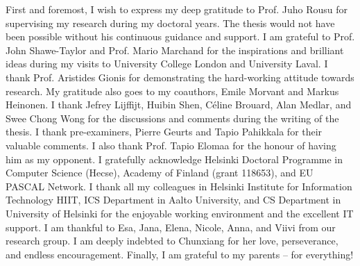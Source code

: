 

\begin{preface}[Espoo]

%
First and foremost, I wish to express my deep gratitude to Prof. Juho Rousu for supervising my research during my doctoral years.
The thesis would not have been possible without his continuous guidance and support. 
%
I am grateful to Prof. John Shawe-Taylor and Prof. Mario Marchand for the inspirations and brilliant ideas during my visits to University College London and University Laval.
%
I thank Prof. Aristides Gionis for demonstrating the hard-working attitude towards research.
My gratitude also goes to my coauthors, Emile Morvant and Markus Heinonen. 
%
I thank Jefrey Lijffijt, Huibin Shen, C\'eline Brouard, Alan Medlar, and Swee Chong Wong for the discussions and comments during the writing of the thesis.
I thank pre-examiners, Pierre Geurts and Tapio Pahikkala for their valuable comments.
I also thank Prof. Tapio Elomaa for the honour of having him as my opponent.
%
I gratefully acknowledge Helsinki Doctoral Programme in Computer Science (Hecse), Academy of Finland (grant 118653), and EU PASCAL Network.
% 
I thank all my colleagues in Helsinki Institute for Information Technology HIIT, ICS Department in Aalto University, and CS Department in University of Helsinki for the enjoyable working environment and the excellent IT support.
%
I am thankful to Esa, Jana, Elena, Nicole, Anna, and Viivi from our research group.
%
%
I am deeply indebted to Chunxiang for her love, perseverance, and endless encouragement.
%
Finally, I am grateful to my parents -- for everything! 


\end{preface}
